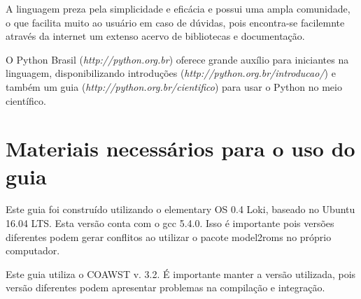 \noindent A linguagem preza pela simplicidade e eficácia e possui uma ampla comunidade, o que facilita muito ao usuário em caso de dúvidas, pois encontra-se facilemnte através da internet um extenso acervo de bibliotecas e documentação.
\bigskip

\noindent O Python Brasil (\textcolor{bleu_cite}{\textit{http://python.org.br}}) oferece grande auxílio para iniciantes na linguagem, disponibilizando introduções (\textcolor{bleu_cite}{\textit{http://python.org.br/introducao/}}) e também um guia (\textcolor{bleu_cite}{\textit{http://python.org.br/cientifico}}) para usar o Python no meio científico.



\section{Materiais necessários para o uso do guia}
\bigskip

\noindent Este guia foi construído utilizando o elementary OS 0.4 Loki, baseado no Ubuntu 16.04 LTS. Esta versão conta com o gcc 5.4.0. Isso é importante pois versões diferentes podem gerar conflitos ao utilizar o pacote model2roms no próprio computador.
\bigskip

\noindent Este guia utiliza o COAWST v. 3.2. É importante manter a versão utilizada, pois versão diferentes podem apresentar problemas na compilação e integração.
